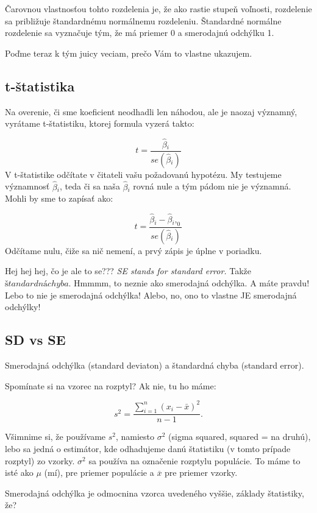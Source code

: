 \documentclass[]{article}
\begin{document}
Čarovnou vlastnosťou tohto rozdelenia je, že ako rastie stupeň voľnosti,
rozdelenie sa približuje štandardnému normálnemu rozdeleniu. Štandardné
normálne rozdelenie sa vyznačuje tým, že má priemer 0 a smerodajnú
odchýlku 1.

Poďme teraz k tým juicy veciam, prečo Vám to vlastne ukazujem.

\hypertarget{t-ux161tatistika}{%
\subsection{t-štatistika}\label{t-ux161tatistika}}

Na overenie, či sme koeficient neodhadli len náhodou, ale je naozaj
významný, vyrátame t-štatistiku, ktorej formula vyzerá takto:

\[t = \frac{\hat\beta{}_i}{se(\hat\beta{}_i)}\] V t-štatistike odčítate
v čitateli vašu požadovanú hypotézu. My testujeme významnosť
\(\hat\beta{}_i\), teda či sa naša \(\hat\beta{}_i\) rovná nule a tým
pádom nie je významná. Mohli by sme to zapísať ako:

\[t = \frac{\hat\beta{}_i - \hat\beta{}_i,_0}{se(\hat\beta{}_i)}\]
Odčítame nulu, čiže sa nič nemení, a prvý zápis je úplne v poriadku.

Hej hej hej, čo je ale to se??? \emph{SE stands for standard error.}
Takže \(štandardná chyba\). Hmmmm, to neznie ako smerodajná odchýlka. A
máte pravdu! Lebo to nie je smerodajná odchýlka! Alebo, no, ono to
vlastne JE smerodajná odchýlky!

\hypertarget{sd-vs-se}{%
\subsection{SD vs SE}\label{sd-vs-se}}

Smerodajná odchýlka (standard deviaton) a štandardná chyba (standard
error).

Spomínate si na vzorec na rozptyl? Ak nie, tu ho máme:

\[s^{2} = \frac{\sum_{i=1}^{n} \left(x_{i} - \bar{x}\right)^{2}} {n-1}.\]

Všimnime si, že používame \(s^{2}\), namiesto \(\sigma^{2}\) (sigma
squared, squared = na druhú), lebo sa jedná o estimátor, kde odhadujeme
danú štatistiku (v tomto prípade rozptyl) zo vzorky. \(\sigma^{2}\) sa
používa na označenie rozptylu populácie. To máme to isté ako \(\mu\)
(mí), pre priemer populácie a \(\overline{x}\) pre priemer vzorky.

Smerodajná odchýlka je odmocnina vzorca uvedeného vyššie, základy
štatistiky, že?
\end{document}
